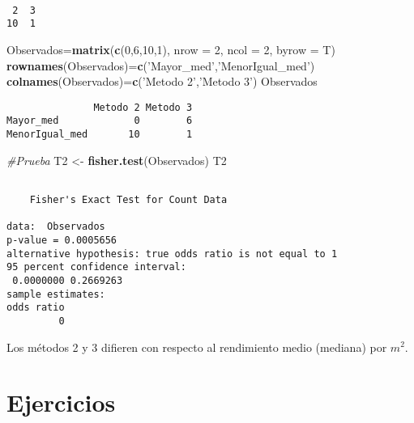 \documentclass[a4paper,oneside,openany]{book}
\newenvironment{Shaded}{\begin{snugshade}}{\end{snugshade}}
\newcommand{\KeywordTok}[1]{\textcolor[rgb]{0.13,0.29,0.53}{\textbf{#1}}}
\newcommand{\DataTypeTok}[1]{\textcolor[rgb]{0.13,0.29,0.53}{#1}}
\newcommand{\DecValTok}[1]{\textcolor[rgb]{0.00,0.00,0.81}{#1}}
\newcommand{\StringTok}[1]{\textcolor[rgb]{0.31,0.60,0.02}{#1}}
\newcommand{\CommentTok}[1]{\textcolor[rgb]{0.56,0.35,0.01}{\textit{#1}}}
\newcommand{\NormalTok}[1]{#1}
\begin{document}
\begin{verbatim}

 2  3 
10  1 
\end{verbatim}

\begin{Shaded}
\begin{Highlighting}[]
\NormalTok{Observados=}\KeywordTok{matrix}\NormalTok{(}\KeywordTok{c}\NormalTok{(}\DecValTok{0}\NormalTok{,}\DecValTok{6}\NormalTok{,}\DecValTok{10}\NormalTok{,}\DecValTok{1}\NormalTok{), }\DataTypeTok{nrow =} \DecValTok{2}\NormalTok{, }\DataTypeTok{ncol =} \DecValTok{2}\NormalTok{, }\DataTypeTok{byrow =}\NormalTok{ T)}
\KeywordTok{rownames}\NormalTok{(Observados)=}\KeywordTok{c}\NormalTok{(}\StringTok{'Mayor_med'}\NormalTok{,}\StringTok{'MenorIgual_med'}\NormalTok{)}
\KeywordTok{colnames}\NormalTok{(Observados)=}\KeywordTok{c}\NormalTok{(}\StringTok{'Metodo 2'}\NormalTok{,}\StringTok{'Metodo 3'}\NormalTok{)}
\NormalTok{Observados}
\end{Highlighting}
\end{Shaded}

\begin{verbatim}
               Metodo 2 Metodo 3
Mayor_med             0        6
MenorIgual_med       10        1
\end{verbatim}

\begin{Shaded}
\begin{Highlighting}[]
\CommentTok{#Prueba}
\NormalTok{T2 <-}\StringTok{ }\KeywordTok{fisher.test}\NormalTok{(Observados)}
\NormalTok{T2}
\end{Highlighting}
\end{Shaded}

\begin{verbatim}

    Fisher's Exact Test for Count Data

data:  Observados
p-value = 0.0005656
alternative hypothesis: true odds ratio is not equal to 1
95 percent confidence interval:
 0.0000000 0.2669263
sample estimates:
odds ratio 
         0 
\end{verbatim}

Los métodos 2 y 3 difieren con respecto al rendimiento medio (mediana)
por \(m^2\).

\section{Ejercicios}\label{ejercicios-12}
\end{document}
